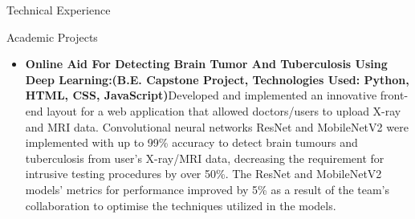 \documentclass[]{mcdowellcv}
\begin{document}
\begin{cvsection}{Technical Experience}
\begin{cvsubsection}{Academic Projects}{}{}
\begin{itemize}
				\item  \textbf{Online Aid For Detecting Brain Tumor And Tuberculosis Using Deep Learning:\newline(B.E. Capstone Project, Technologies Used: Python, HTML, CSS, JavaScript)}\newline Developed and implemented an innovative front-end layout for a web application that allowed doctors/users to upload X-ray and MRI data. Convolutional neural networks ResNet and MobileNetV2 were implemented with up to 99\% accuracy to detect brain tumours and tuberculosis from user's X-ray/MRI data, decreasing the requirement for intrusive testing procedures by over 50\%. The ResNet and MobileNetV2 models' metrics for performance improved by 5\% as a result of the team's collaboration to optimise the techniques utilized in the models.
			\end{itemize}
		\end{cvsubsection}
	\end{cvsection}
	
\end{document}
